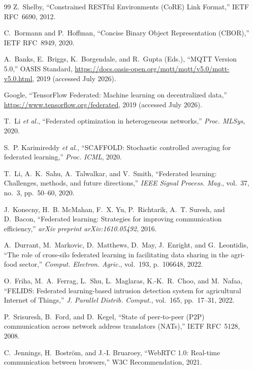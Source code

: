 \documentclass[journal]{IEEEtran}
\begin{document}
\begin{thebibliography}{99}
Z.~Shelby,
``Constrained RESTful Environments (CoRE) Link Format,''
IETF RFC~6690, 2012.

C.~Bormann and P.~Hoffman,
``Concise Binary Object Representation (CBOR),''
IETF RFC~8949, 2020.

A.~Banks, E.~Briggs, K.~Borgendale, and R.~Gupta (Eds.),
``MQTT Version 5.0,''
OASIS Standard, \url{https://docs.oasis-open.org/mqtt/mqtt/v5.0/mqtt-v5.0.html}, 2019 (accessed July 2026).

Google,
``TensorFlow Federated: Machine learning on decentralized data,''
\url{https://www.tensorflow.org/federated}, 2019 (accessed July 2026).

T.~Li \emph{et al.},
``Federated optimization in heterogeneous networks,''
\emph{Proc. MLSys}, 2020.

S.~P. Karimireddy \emph{et al.},
``SCAFFOLD: Stochastic controlled averaging for federated learning,''
\emph{Proc. ICML}, 2020.

T.~Li, A.~K.~Sahu, A.~Talwalkar, and V.~Smith,
``Federated learning: Challenges, methods, and future directions,''
\emph{IEEE Signal Process. Mag.}, vol.~37, no.~3, pp.~50--60, 2020.

J.~Konecny, H.~B. McMahan, F.~X. Yu, P.~Richtarik, A.~T. Suresh, and D.~Bacon,
``Federated learning: Strategies for improving communication efficiency,''
\emph{arXiv preprint arXiv:1610.05492}, 2016.

A.~Durrant, M.~Markovic, D.~Matthews, D.~May, J.~Enright, and G.~Leontidis,
``The role of cross-silo federated learning in facilitating data sharing in the agri-food sector,''
\emph{Comput. Electron. Agric.}, vol.~193, p.~106648, 2022.

O.~Friha, M.~A.~Ferrag, L.~Shu, L.~Maglaras, K.-K.~R.~Choo, and M.~Nafaa,
``FELIDS: Federated learning-based intrusion detection system for agricultural Internet of Things,''
\emph{J. Parallel Distrib. Comput.}, vol.~165, pp.~17--31, 2022.

P.~Srisuresh, B.~Ford, and D.~Kegel,
``State of peer-to-peer (P2P) communication across network address translators (NATs),''
IETF RFC~5128, 2008.

C.~Jennings, H.~Boström, and J.-I. Bruaroey,
``WebRTC 1.0: Real-time communication between browsers,''
W3C Recommendation, 2021.


\end{thebibliography}
\end{document}
